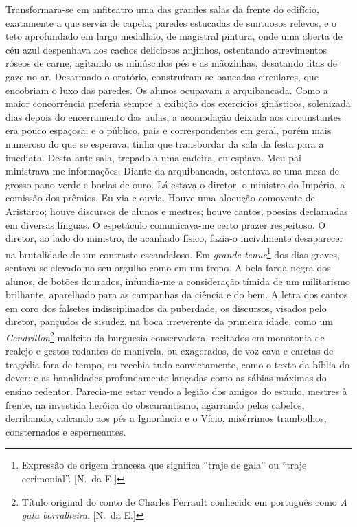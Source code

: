Transformara{}-se em anfiteatro uma das
grandes salas da frente do edifício, exatamente a que servia de capela;
paredes estucadas de suntuosos relevos, e o teto aprofundado em largo
medalhão, de magistral pintura, onde uma aberta de céu azul despenhava
aos cachos deliciosos anjinhos, ostentando atrevimentos róseos de
carne, agitando os minúsculos pés e as mãozinhas, desatando fitas de
gaze no ar. Desarmado o oratório, construíram{}-se bancadas circulares,
que encobriam o luxo das paredes. Os alunos ocupavam a arquibancada.
Como a maior concorrência preferia sempre a exibição dos exercícios
ginásticos, solenizada dias depois do encerramento das aulas, a
acomodação deixada aos circunstantes era pouco espaçosa; e o público,
pais e correspondentes em geral, porém mais numeroso do que se
esperava, tinha que transbordar da sala da festa para a imediata. Desta
ante{}-sala, trepado a uma cadeira, eu espiava. Meu pai ministrava{}-me
informações. Diante da arquibancada, ostentava{}-se uma mesa de grosso
pano verde e borlas de ouro. Lá estava o diretor, o ministro do
Império, a comissão dos prêmios. Eu via e ouvia. Houve uma alocução
comovente de Aristarco; houve discursos de alunos e mestres; houve
cantos, poesias declamadas em diversas línguas. O espetáculo
comunicava{}-me certo prazer respeitoso. O diretor, ao lado do
ministro, de acanhado físico, fazia{}-o incivilmente desaparecer na
brutalidade de um contraste escandaloso. Em \textit{grande tenue}\footnote{ Expressão 
de origem francesa que significa ``traje de gala'' ou ``traje cerimonial''. [N.~da E.]} 
dos dias graves, sentava{}-se elevado no seu orgulho como em um trono. A bela
farda negra dos alunos, de botões dourados, infundia{}-me a
consideração tímida de um militarismo brilhante, aparelhado para as
campanhas da ciência e do bem. A letra dos cantos, em coro dos falsetes
indisciplinados da puberdade, os discursos, visados pelo diretor,
pançudos de sisudez, na boca irreverente da primeira idade, como um
\textit{Cendrillon}\footnote{ Título original do conto de Charles Perrault 
conhecido em português como \textit{A gata borralheira}. [N.~da E.]} 
malfeito da burguesia conservadora, recitados em monotonia
de realejo e gestos rodantes de manivela, ou exagerados, de voz cava e
caretas de tragédia fora de tempo, eu recebia tudo convictamente, como
o texto da bíblia do dever; e as banalidades profundamente lançadas
como as sábias máximas do ensino redentor. Parecia{}-me estar vendo a
legião dos amigos do estudo, mestres à frente, na investida heróica do
obscurantismo, agarrando pelos cabelos, derribando, calcando aos pés a
Ignorância e o Vício, misérrimos trambolhos, consternados e esperneantes. 

